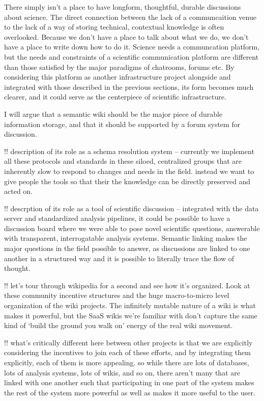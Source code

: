 \documentclass{article}
\begin{document}
There simply isn't a place to have longform, thoughtful, durable
discussions about science. The direct connection between the lack of a
communcaition venue to the lack of a way of storing technical,
contextual knowledge is often overlooked. Because we don't have a place
to talk about what we do, we don't have a place to write down how to do
it. Science needs a communcation platform, but the needs and constraints
of a scientific communication platform are different than those
satisfied by the major paradigms of chatrooms, forums etc. By
considering this platform as another infrastructure project alongside
and integrated with those described in the previous sections, its form
becomes much clearer, and it could serve as the centerpiece of
scientific infrastructure.

I will argue that a semantic wiki should be the major piece of durable
information storage, and that it should be supported by a forum system
for discussion.

!! description of its role as a schema resolution system -- currently we
implement all these protocols and standards in these siloed, centralized
groups that are inherently slow to respond to changes and needs in the
field. instead we want to give people the tools so that their the
knowledge can be directly preserved and acted on.

!! descrption of its role as a tool of scientific discussion --
integrated with the data server and standardized analysis pipelines, it
could be possible to have a discussion board where we were able to pose
novel scientific questions, answerable with transparent, interrogatable
analysis systems. Semantic linking makes the major questions in the
field possible to answer, as discussions are linked to one another in a
structured way and it is possible to literally trace the flow of
thought.

!! let's tour through wikipedia for a second and see how it's organized.
Look at these community incentive structures and the huge macro-to-micro
level organization of the wiki projects. The infinitely mutable nature
of a wiki is what makes it powerful, but the SaaS wikis we're familiar
with don't capture the same kind of `build the ground you walk on'
energy of the real wiki movement.

!! what's critically different here between other projects is that we
are explicitly considering the incentives to join each of these efforts,
and by integrating them explicitly, each of them is more appealing. so
while there are lots of databases, lots of analysis systems, lots of
wikis, and so on, there aren't many that are linked with one another
such that participating in one part of the system makes the rest of the
system more powerful as well as makes it more useful to the user.
\end{document}

